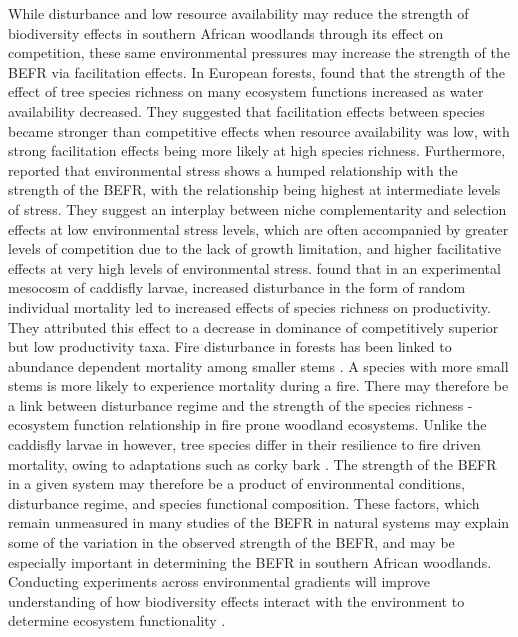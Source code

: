 \begin{refsection}
While disturbance and low resource availability may reduce the strength of biodiversity effects in southern African woodlands through its effect on competition, these same environmental pressures may increase the strength of the BEFR via facilitation effects. In European forests, \citet{Ratcliffe2017} found that the strength of the effect of tree species richness on many ecosystem functions increased as water availability decreased. They suggested that facilitation effects between species became stronger than competitive effects when resource availability was low, with strong facilitation effects being more likely at high species richness. Furthermore, \citet{Baert2018} reported that environmental stress shows a humped relationship with the strength of the BEFR, with the relationship being highest at intermediate levels of stress. They suggest an interplay between niche complementarity and selection effects at low environmental stress levels, which are often accompanied by greater levels of competition due to the lack of growth limitation, and higher facilitative effects at very high levels of environmental stress. \citet{Cardinale2002} found that in an experimental mesocosm of caddisfly larvae, increased disturbance in the form of random individual mortality led to increased effects of species richness on productivity. They attributed this effect to a decrease in dominance of competitively superior but low productivity taxa. Fire disturbance in forests has been linked to abundance dependent mortality among smaller stems \citep{Roques2001}. A species with more small stems is more likely to experience mortality during a fire. There may therefore be a link between disturbance regime and the strength of the species richness - ecosystem function relationship in fire prone woodland ecosystems. Unlike the caddisfly larvae in \citet{Cardinale2002} however, tree species differ in their resilience to fire driven mortality, owing to adaptations such as corky bark \citep{Solbrig1996}. The strength of the BEFR in a given system may therefore be a product of environmental conditions, disturbance regime, and species functional composition. These factors, which remain unmeasured in many studies of the BEFR in natural systems may explain some of the variation in the observed strength of the BEFR, and may be especially important in determining the BEFR in southern African woodlands. Conducting experiments across environmental gradients will improve understanding of how biodiversity effects interact with the environment to determine ecosystem functionality \citep{Turnbull2016, Tilman2014}. 


\end{refsection}
